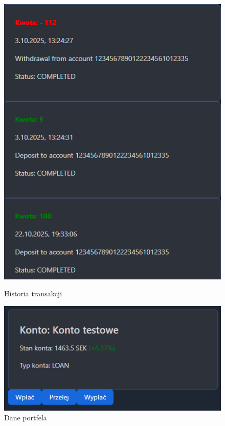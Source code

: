 \begin{figure}[H]
		\begin{minipage}{0.5\textwidth}
	\centering
	\includegraphics[width=0.7\linewidth]{images/TransakcjeHistoria}
	\caption{Historia transakcji}
	\label{fig:transakcjehistoria}
\end{minipage}
\hfill
		\begin{minipage}{0.5\textwidth}
	\centering
	\includegraphics[width=\linewidth]{images/DanePortfela}
	\caption{Dane portfela}
	\label{fig:daneportfela}
\end{minipage}
\end{figure}
